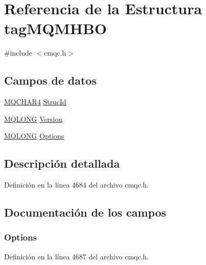 \hypertarget{structtag_m_q_m_h_b_o}{}\section{Referencia de la Estructura tag\+M\+Q\+M\+H\+B\+O}
\label{structtag_m_q_m_h_b_o}


{\ttfamily \#include $<$cmqc.\+h$>$}

\subsection*{Campos de datos}
\begin{DoxyCompactItemize}
\item 
\hyperlink{cmqc_8h_a12590e546ed66fda7cf21c1d5cefa31d}{M\+Q\+C\+H\+A\+R4} \hyperlink{structtag_m_q_m_h_b_o_a0530922ca944569b52601d74941f96e4}{Struc\+Id}
\item 
\hyperlink{cmqc_8h_a1fb8d28cbda3fa8766a9821230cdb6d5}{M\+Q\+L\+O\+N\+G} \hyperlink{structtag_m_q_m_h_b_o_a0656ef8f766b3907d394d88a35d7b7e9}{Version}
\item 
\hyperlink{cmqc_8h_a1fb8d28cbda3fa8766a9821230cdb6d5}{M\+Q\+L\+O\+N\+G} \hyperlink{structtag_m_q_m_h_b_o_ad7aff2d6c6044809464380998d24ec5c}{Options}
\end{DoxyCompactItemize}


\subsection{Descripción detallada}


Definición en la línea 4684 del archivo cmqc.\+h.



\subsection{Documentación de los campos}
\hypertarget{structtag_m_q_m_h_b_o_ad7aff2d6c6044809464380998d24ec5c}{}
\subsubsection[{Options}]{ Options}\label{structtag_m_q_m_h_b_o_ad7aff2d6c6044809464380998d24ec5c}


Definición en la línea 4687 del archivo cmqc.\+h.

